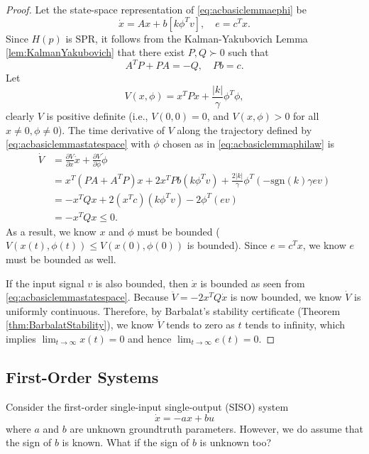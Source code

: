 \documentclass[
]{book}
\theoremstyle{definition}
\theoremstyle{definition}
\theoremstyle{definition}
\theoremstyle{definition}
\theoremstyle{remark}
\begin{document}
\begin{proof}
Let the state-space representation of \eqref{eq:acbasiclemmaephi} be
\begin{equation}
\dot{x} = A x + b [k \phi^T v], \quad e = c^T x.
\label{eq:acbasiclemmastatespace}
\end{equation}
Since \(H(p)\) is SPR, it follows from the Kalman-Yakubovich Lemma \ref{lem:KalmanYakubovich} that there exist \(P,Q \succ 0\) such that
\[
A^T P + P A = -Q, \quad Pb = c.
\]
Let
\[
V(x,\phi) = x^T P x + \frac{|k|}{\gamma} \phi^T \phi,
\]
clearly \(V\) is positive definite (i.e., \(V(0,0)=0\), and \(V(x,\phi) > 0\) for all \(x \neq 0, \phi \neq 0\)). The time derivative of \(V\) along the trajectory defined by \eqref{eq:acbasiclemmastatespace} with \(\phi\) chosen as in \eqref{eq:acbasiclemmaphilaw} is
\begin{align}
\dot{V} & = \frac{\partial V}{\partial x} \dot{x} + \frac{\partial V}{\partial \phi} \dot{\phi} \\
&= x^T (PA + A^T P) x + 2 x^T P b (k \phi^T v) + \frac{2|k|}{\gamma} \phi^T (- \mathrm{sgn}(k) \gamma e v) \\
& = - x^T Q x + 2 (x^T c)(k\phi^T v) - 2 \phi^T (e v) \\
& = - x^T Q x \leq 0.
\end{align}
As a result, we know \(x\) and \(\phi\) must be bounded (\(V(x(t),\phi(t)) \leq V(x(0),\phi(0))\) is bounded). Since \(e = c^T x\), we know \(e\) must be bounded as well.

If the input signal \(v\) is also bounded, then \(\dot{x}\) is bounded as seen from \eqref{eq:acbasiclemmastatespace}. Because \(\ddot{V} = -2x^T Q \dot{x}\) is now bounded, we know \(\dot{V}\) is uniformly continuous. Therefore, by Barbalat's stability certificate (Theorem \ref{thm:BarbalatStability}), we know \(\dot{V}\) tends to zero as \(t\) tends to infinity, which implies \(\lim_{t \rightarrow \infty} x(t) = 0\) and hence \(\lim_{t \rightarrow \infty} e(t) = 0\).
\end{proof}

\hypertarget{first-order-systems}{%
\subsection{First-Order Systems}\label{first-order-systems}}

Consider the first-order single-input single-output (SISO) system
\begin{equation}
\dot{x} = - a x + b u
\label{eq:ac-first-linear}
\end{equation}
where \(a\) and \(b\) are unknown groundtruth parameters. However, we do assume that the sign of \(b\) is known. {What if the sign of \(b\) is unknown too?}
\end{document}
